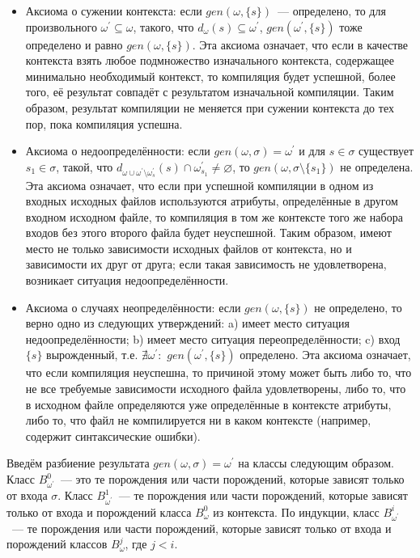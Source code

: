 \begin{itemize}
	\item Аксиома о сужении контекста: если $gen(\omega,\{s\})$~--- определено, то для произвольного $\omega^\prime\subseteq\omega$, такого, что $d_\omega(s)\subseteq\omega^\prime$, $gen(\omega^\prime, \{s\})$ тоже определено и равно $gen(\omega,\{s\})$. Эта аксиома означает, что если в качестве контекста взять любое подмножество изначального контекста, содержащее минимально необходимый контекст, то компиляция будет успешной, более того, её результат совпадёт с результатом изначальной компиляции. Таким образом, результат компиляции не меняется при сужении контекста до тех пор, пока компиляция успешна.
	
	\item Аксиома о недоопределённости: если $gen(\omega, \sigma) = \omega^\prime$ и для $s \in \sigma$ существует $s_1 \in \sigma$, такой, что $d_{\omega \cup \omega^\prime \setminus \omega^\prime_s}(s) \cap \omega^\prime_{s_1} \neq \varnothing$, то $gen(\omega, \sigma \setminus \{s_1\})$ не определена. Эта аксиома означает, что если при успешной компиляции в одном из входных исходных файлов используются атрибуты, определённые в другом входном исходном файле, то компиляция в том же контексте того же набора входов без этого второго файла будет неуспешной. Таким образом, имеют место не только зависимости исходных файлов от контекста, но и зависимости их друг от друга; если такая зависимость не удовлетворена, возникает ситуация недоопределённости.
	
	\item Аксиома о случаях неопределённости: если $gen(\omega, \{s\})$ не определено, то верно одно из следующих утверждений: a) имеет место ситуация недоопределённости; b) имеет место ситуация переопределённости; c) вход $\{s\}$ вырожденный, т.е. $\nexists \omega^\prime:$ $gen(\omega^\prime, \{s\})$ определено. Эта аксиома означает, что если компиляция неуспешна, то причиной этому может быть либо то, что не все требуемые зависимости исходного файла удовлетворены, либо то, что в исходном файле определяются уже определённые в контексте атрибуты, либо то, что файл не компилируется ни в каком контексте (например, содержит синтаксические ошибки).
\end{itemize}

Введём разбиение результата $gen(\omega, \sigma) = \omega^\prime$ на классы следующим образом. Класс $B^0_{\omega^\prime}$~--- это те порождения или части порождений, которые зависят только от входа $\sigma$. Класс $B^1_{\omega^\prime}$~--- те порождения или части порождений, которые зависят только от входа и порождений класса $B^0_{\omega}$ из контекста. По индукции, класс $B^i_{\omega^\prime}$~--- те порождения или части порождений, которые зависят только от входа и порождений классов $B^j_{\omega}$, где $j < i$.

